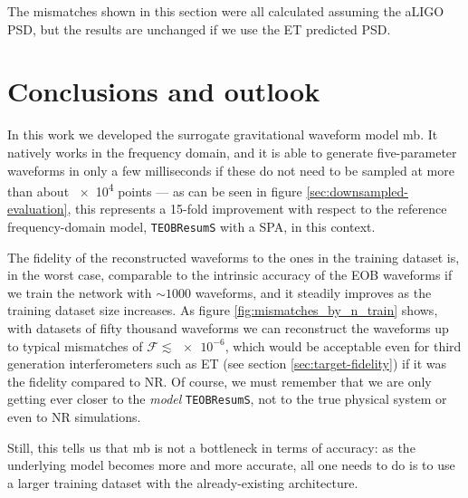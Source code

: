 \documentclass[main.tex]{subfiles}
\begin{document}
The mismatches shown in this section were all calculated assuming the \ac{aLIGO} \ac{PSD}, but the results are unchanged if we use the \ac{ET} predicted \ac{PSD}. 


\chapter{Conclusions and outlook}


In this work we developed the surrogate gravitational waveform model \ac{mb}.
It natively works in the frequency domain, and it is able to generate five-parameter waveforms in only a few milliseconds if these do not need to be sampled at more than about \num{e4} points --- as can be seen in figure \ref{sec:downsampled-evaluation}, this represents a 15-fold improvement with respect to the reference frequency-domain model, \texttt{TEOBResumS} with a \ac{SPA}, in this context.

The fidelity of the reconstructed waveforms to the ones in the training dataset is, in the worst case, comparable to the intrinsic accuracy of the \ac{EOB} waveforms if we train the network with \(\sim 1000\) waveforms, and it steadily improves as the training dataset size increases.
As figure \ref{fig:mismatches_by_n_train} shows, with datasets of fifty thousand waveforms we can reconstruct the waveforms up to typical mismatches of \(\mathcal{F} \lesssim \num{e-6}\), which would be acceptable even for third generation interferometers such as \ac{ET} (see section \ref{sec:target-fidelity}) if it was the fidelity compared to \ac{NR}.
Of course, we must remember that we are only getting ever closer to the \emph{model} \texttt{TEOBResumS}, not to the true physical system or even to \ac{NR} simulations.

Still, this tells us that \ac{mb} is not a bottleneck in terms of accuracy: as the underlying model becomes more and more accurate, all one needs to do is to use a larger training dataset with the already-existing architecture.

\end{document}
